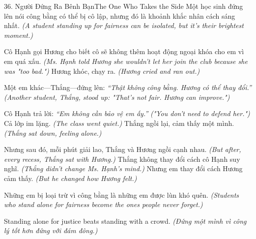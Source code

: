 \begin{truyen}{36. Người Đứng Ra Bênh Bạn}{The One Who Takes the Side}
Một học sinh đứng lên nói công bằng có thể bị cô lập, nhưng đó là khoảnh khắc nhân cách sáng nhất.
\textit{(A student standing up for fairness can be isolated, but it's their brightest moment.)}

Cô Hạnh gọi Hương cho biết cô sẽ không thêm hoạt động ngoại khóa cho em vì em quá xấu.
\textit{(Ms. Hạnh told Hương she wouldn't let her join the club because she was "too bad.")}
Hương khóc, chạy ra.
\textit{(Hương cried and ran out.)}

Một em khác—Thắng—đứng lên: \textit{``Thật không công bằng. Hương có thể thay đổi.''}
\textit{(Another student, Thắng, stood up: "That's not fair. Hương can improve.")}

Cô Hạnh trả lời: \textit{``Em không cần bảo vệ em ấy.''}
\textit{("You don't need to defend her.")}
Cả lớp im lặng.
\textit{(The class went quiet.)}
Thắng ngồi lại, cảm thấy một mình.
\textit{(Thắng sat down, feeling alone.)}

Nhưng sau đó, mỗi phút giải lao, Thắng và Hương ngồi cạnh nhau.
\textit{(But after, every recess, Thắng sat with Hương.)}
Thắng không thay đổi cách cô Hạnh suy nghĩ.
\textit{(Thắng didn't change Ms. Hạnh's mind.)}
Nhưng em thay đổi cách Hương cảm thấy.
\textit{(But he changed how Hương felt.)}

Những em bị loại trừ vì công bằng là những em được lùn khó quên.
\textit{(Students who stand alone for fairness become the ones people never forget.)}
\end{truyen}

\begin{baihoc}
Standing alone for justice beats standing with a crowd.
\textit{(Đứng một mình vì công lý tốt hơn đứng với đám đông.)}
\end{baihoc}

